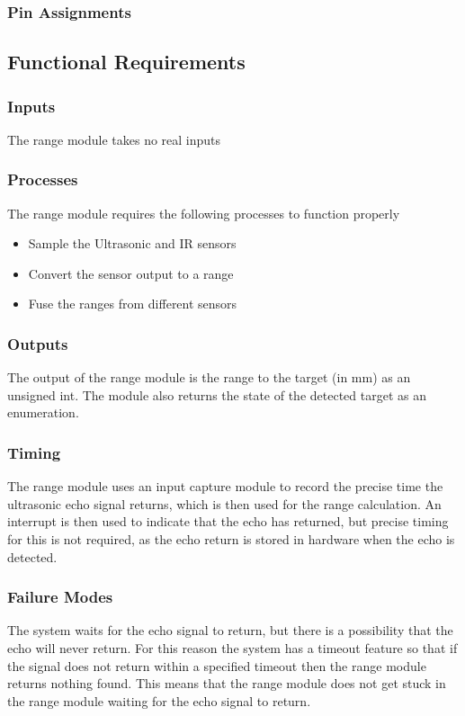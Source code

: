 \documentclass[]{report}
\begin{document}
\subsubsection{Pin Assignments}


\subsection{Functional Requirements}
\subsubsection{Inputs}
The range module takes no real inputs

\subsubsection{Processes}
The range module requires the following processes to function properly
\begin{itemize}
	\item Sample the Ultrasonic and IR sensors
	\item Convert the sensor output to a range
	\item Fuse the ranges from different sensors
\end{itemize}

\subsubsection{Outputs}
The output of the range module is the range to the target (in mm) as an unsigned int. The module also returns the state of the detected target as an enumeration.

\subsubsection{Timing}
The range module uses an input capture module to record the precise time the ultrasonic echo signal returns, which is then used for the range calculation. An interrupt is then used to indicate that the echo has returned, but precise timing for this is not required, as the echo return is stored in hardware when the echo is detected.

\subsubsection{Failure Modes}
The system waits for the echo signal to return, but there is a possibility that the echo will never return. For this reason the system has a timeout feature so that if the signal does not return within a specified timeout then the range module returns nothing found. This means that the range module does not get stuck in the range module waiting for the echo signal to return.
\end{document}
